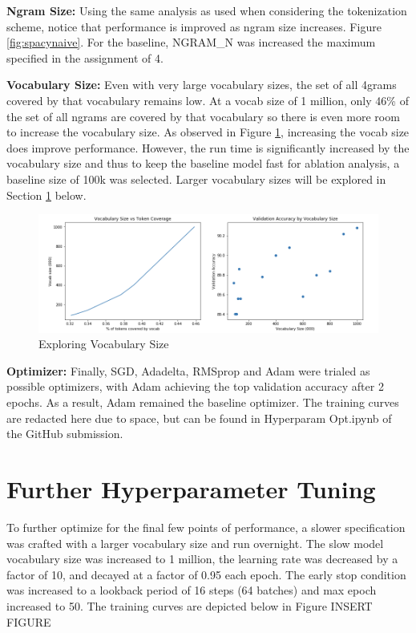\documentclass[a4paper,10pt]{article}
\begin{document}
\par
\justify
\textbf{Ngram Size:} Using the same analysis as used when considering the tokenization scheme, notice that performance is improved as ngram size increases. Figure \ref{fig:spacynaive}. For the baseline, NGRAM\_N was increased the maximum specified in the assignment of 4.

\par
\justify
\textbf{Vocabulary Size:} Even with very large vocabulary sizes, the set of all 4grams covered by that vocabulary remains low. At a vocab size of 1 million, only 46\% of the set of all ngrams are covered by that vocabulary so there is even more room to increase the vocabulary size. As observed in Figure \ref{fig:vocabsize}, increasing the vocab size does improve performance. However, the run time is significantly increased by the vocabulary size and thus to keep the baseline model fast for ablation analysis, a baseline size of 100k was selected. Larger vocabulary sizes will be explored in Section \ref{furthertuning} below.


\begin{figure}[h]
    \centering
    \includegraphics[scale=0.4]{vocabsize}
    \caption{Exploring Vocabulary Size}
    \label{fig:vocabsize}
\end{figure}

\par
\justify
\textbf{Optimizer:} Finally, SGD, Adadelta, RMSprop and Adam were trialed as possible optimizers, with Adam achieving the top validation accuracy after 2 epochs. As a result, Adam remained the baseline optimizer. The training curves are redacted here due to space, but can be found in Hyperparam Opt.ipynb of the GitHub submission.

\section{Further Hyperparameter Tuning}\label{furthertuning}
To further optimize for the final few points of performance, a slower specification was crafted with a larger vocabulary size and run overnight. The slow model vocabulary size was increased to 1 million, the learning rate was decreased by a factor of 10, and decayed at a factor of 0.95 each epoch. The early stop condition was increased to a lookback period of 16 steps (64 batches) and max epoch increased to 50. The training curves are depicted below in Figure INSERT FIGURE

\medskip


\end{document}
